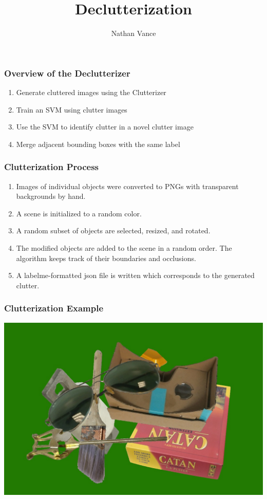 \documentclass{beamer}
\title{Declutterization}
\author{Nathan Vance}
\date{}
\begin{document}
\begin{frame}
  \titlepage
\end{frame}

\begin{frame}
  \frametitle{Overview of the Declutterizer}
  \begin{enumerate}
    \item Generate cluttered images using the Clutterizer
    \item Train an SVM using clutter images
    \item Use the SVM to identify clutter in a novel clutter image
    \item Merge adjacent bounding boxes with the same label
  \end{enumerate}
\end{frame}

\begin{frame}
  \frametitle{Clutterization Process}
  \begin{enumerate}
    \item Images of individual objects were converted to PNGs with transparent backgrounds by hand.
    \item A scene is initialized to a random color.
    \item A random subset of objects are selected, resized, and rotated.
    \item The modified objects are added to the scene in a random order. The algorithm keeps track of their boundaries and occlusions.
    \item A labelme-formatted json file is written which corresponds to the generated clutter.
  \end{enumerate}
\end{frame}

\begin{frame}
  \frametitle{Clutterization Example}
  \includegraphics[width=\textwidth]{generated71.jpg}
\end{frame}
\end{document}
